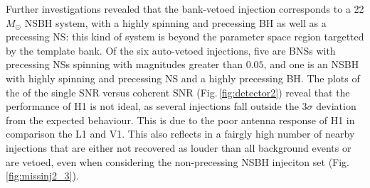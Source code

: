 \documentclass[binding=0.6cm, LaM]{sapthesis}
\begin{document}
        Further investigations revealed that the bank-vetoed injection corresponds to a 22$M_\odot$ NSBH system,
        with a highly spinning and precessing BH as well as a precessing NS: this kind of system is beyond the parameter space region targetted by the template bank.
        Of the six auto-vetoed injections, five are BNSs with precessing NSs spinning with magnitudes greater than $0.05$, and
        one is an NSBH with highly spinning and precessing NS and a highly precessing BH.
        The plots of the of the single SNR versus coherent SNR (Fig.\,\ref{fig:detector2}) reveal that the performance of H1 is not ideal, as several injections fall outside the $3\sigma$ deviation from the expected behaviour.
        This is due to the poor antenna response of H1 in comparison the L1 and V1.  This also reflects in a fairgly high number of nearby injections that are either not recovered as louder than all background events or are vetoed, even when considering the non-precessing NSBH injeciton set (Fig.\,\ref{fig:missinj2_3}).
\end{document}
